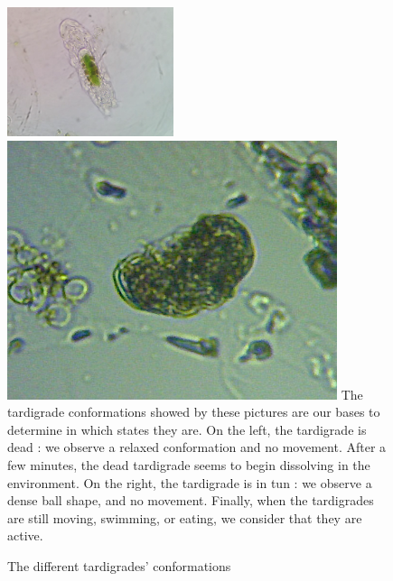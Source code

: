 \documentclass[12pt,a4paper, twocolumn]{article}
\begin{document}
\begin{figure}
\includegraphics[width=\linewidth]{dead.png}
\includegraphics[width=\linewidth]{tun.png}
The tardigrade conformations showed by these pictures are our bases to determine in which states they are. On the left, the tardigrade is dead : we observe a relaxed conformation and no movement. After a few minutes, the dead tardigrade seems to begin dissolving in the environment. On the right, the tardigrade is in tun : we observe a dense ball shape, and no movement. Finally, when the tardigrades are still moving, swimming, or eating, we consider that they are active.
\label{dead-tun}
\caption{The different tardigrades' conformations}
\end{figure}
\end{document}
